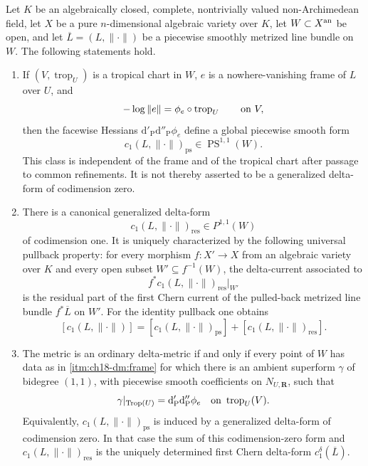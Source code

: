 \begin{lemma}
\label{lem:ch18-delta-metric-gluing}
Let \(K\) be an algebraically closed, complete, nontrivially valued
non-Archimedean field, let \(X\) be a pure \(n\)-dimensional algebraic
variety over \(K\), let \(W\subset X^{\mathrm{an}}\) be open, and let
\(\overline L=(L,\|\cdot\|)\) be a piecewise smoothly metrized line bundle
on \(W\).  The following statements hold.
\begin{enumerate}
\item\label{itm:ch18-dm:frame}
 If \((V,\operatorname{trop}_U)\) is a tropical chart in \(W\), \(e\) is a
 nowhere-vanishing frame of \(L\) over \(U\), and
 \[
       -\log\|e\|=\phi_e\circ\operatorname{trop}_U
       \qquad\hbox{on }V,
 \]
 then the facewise Hessians
 \(\mathrm d'_{\mathrm P}\mathrm d''_{\mathrm P}\phi_e\) define a global
 piecewise smooth form
 \[
       c_1(L,\|\cdot\|)_{\mathrm{ps}}\in
       \operatorname{PS}^{1,1}(W).
 \]
 This class is independent of the frame and of the tropical chart after
 passage to common refinements.  It is not thereby asserted to be a
 generalized delta-form of codimension zero.

\item\label{itm:ch18-dm:current}
 There is a canonical generalized delta-form
 \[
       c_1(L,\|\cdot\|)_{\mathrm{res}}
       \in P^{1,1}(W)
 \]
 of codimension one.  It is uniquely characterized by the following
 universal pullback property: for every morphism \(f:X'\to X\) from an
 algebraic variety over \(K\) and every open subset
 \(W'\subseteq f^{-1}(W)\), the delta-current associated to
 \[
        f^*c_1(L,\|\cdot\|)_{\mathrm{res}}\big|_{W'}
 \]
 is the residual part of the first Chern current of the pulled-back
 metrized line bundle \(f^*\overline L\) on \(W'\).  For the identity
 pullback one obtains
 \begin{equation}
 \label{eq:ch18-dm-current-decomposition}
 [c_1(L,\|\cdot\|)]
   =[c_1(L,\|\cdot\|)_{\mathrm{ps}}]
    +[c_1(L,\|\cdot\|)_{\mathrm{res}}].
 \end{equation}

\item\label{itm:ch18-dm:delta}
 The metric is an ordinary delta-metric if and only if every point of \(W\)
 has data as in \cref{itm:ch18-dm:frame} for which there is an ambient
 superform \(\gamma\) of bidegree \((1,1)\), with piecewise smooth
 coefficients on \(N_{U,\mathbf R}\), such that
 \begin{equation}
 \label{eq:ch18-dm-hessian-lift}
    \gamma|_{\operatorname{Trop}(U)}
      =\mathrm d'_{\mathrm P}\mathrm d''_{\mathrm P}\phi_e
      \quad\hbox{on }\operatorname{trop}_U(V).
 \end{equation}
 Equivalently, \(c_1(L,\|\cdot\|)_{\mathrm{ps}}\) is induced by a
 generalized delta-form of codimension zero.  In that case the sum of this
 codimension-zero form and
 \(c_1(L,\|\cdot\|)_{\mathrm{res}}\) is the uniquely determined first Chern
 delta-form \(c_1^\delta(\overline L)\).


\end{enumerate}
\end{lemma}
